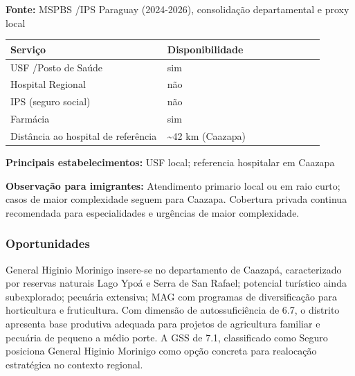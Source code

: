 \textbf{Fonte:} MSPBS /\allowbreak  IPS Paraguay (2024-2026), consolidação
departamental e proxy local

{\def\LTcaptype{none} %
\begin{longtable}{@{}>{\raggedright\arraybackslash}p{0.45\linewidth} >{\raggedright\arraybackslash}p{0.45\linewidth}@{}}
\toprule\noalign{}
Serviço & Disponibilidade \\
\midrule\noalign{}
\endhead
\bottomrule\noalign{}
\endlastfoot
USF /\allowbreak  Posto de Saúde & sim \\
Hospital Regional & não \\
IPS (seguro social) & não \\
Farmácia & sim \\
Distância ao hospital de referência & \textasciitilde42 km (Caazapa) \\
\end{longtable}
}

\textbf{Principais estabelecimentos:} USF local; referencia hospitalar
em Caazapa

\textbf{Observação para imigrantes:} Atendimento primario local ou em
raio curto; casos de maior complexidade seguem para Caazapa. Cobertura
privada continua recomendada para especialidades e urgências de maior
complexidade.
\newpage

\subsubsection*{Oportunidades}\label{oport-general-higinio-morinigo-0607}
General Higinio Morinigo insere-se no departamento de Caazapá, caracterizado por reservas naturais Lago Ypoá e Serra de San Rafael; potencial turístico ainda subexplorado; pecuária extensiva; MAG com programas de diversificação para horticultura e fruticultura. Com dimensão de autossuficiência de 6.7, o distrito apresenta base produtiva adequada para projetos de agricultura familiar e pecuária de pequeno a médio porte. A GSS de 7.1, classificado como Seguro posiciona General Higinio Morinigo como opção concreta para realocação estratégica no contexto regional.

